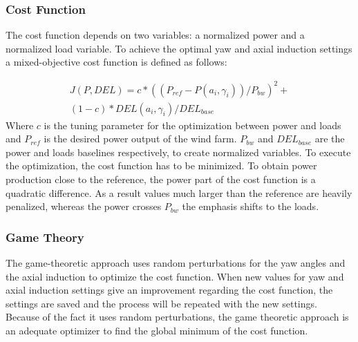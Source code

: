 \subsubsection{Cost Function}
The cost function depends on two variables: a normalized power and a normalized load variable. To achieve the optimal yaw and axial induction settings a mixed-objective cost function is defined as follows:

\begin{equation}
\begin{aligned}
J(P,DEL) = c*((P_{ref}-P(a_i,\gamma_i))/P_{bw})^2  + \\
(1-c)*DEL(a_i,\gamma_i)/DEL_{base}
\end{aligned}
 \label{eq:costf}
\end{equation}
Where $c$ is the tuning parameter for the optimization between power and loads and $P_{ref}$ is the desired power output of the wind farm. $P_{bw}$ and $DEL_{base}$ are the power and loads baselines respectively, to create normalized variables.
\newline
To execute the optimization, the cost function has to be minimized. To obtain power production close to the reference, the power part of the cost function is a quadratic difference. As a result values much larger than the reference are heavily penalized, whereas the power crosses $P_{bw}$ the emphasis shifts to the loads.

\subsubsection{Game Theory}
The game-theoretic approach uses random perturbations for the yaw angles and the axial induction to optimize the cost function. When new values for yaw and axial induction settings give an improvement regarding the cost function, the settings are saved and the process will be repeated with the new settings. Because of the fact it uses random perturbations, the game theoretic approach is an adequate optimizer to find the global minimum of the cost function.\cite{Dijk2016}




